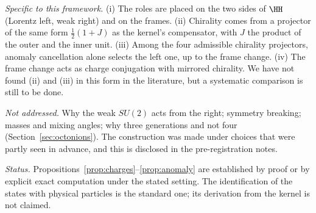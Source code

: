 \emph{Specific to this framework.}  (i) The roles are placed on the two sides of \(\HH\) (Lorentz left, weak right) and on the frames.
(ii) Chirality comes from a projector of the same form \(\tfrac12(1+J)\) as the kernel's compensator, with \(J\) the product of the outer and
the inner unit.  (iii) Among the four admissible chirality projectors, anomaly cancellation alone selects the left one, up to the frame
change.  (iv) The frame change acts as charge conjugation with mirrored chirality.  We have not found (ii) and (iii) in this form in the
literature, but a systematic comparison is still to be done.

\emph{Not addressed.}  Why the weak \(SU(2)\) acts from the right; symmetry breaking; masses and mixing angles; why three generations and
not four (Section~\ref{sec:octonions}).  The construction was made under choices that were partly seen in advance, and this is disclosed in
the pre-registration notes.

\medskip\noindent\emph{Status.}  Propositions~\ref{prop:charges}--\ref{prop:anomaly} are established by proof or by explicit exact
computation under the stated setting.  The identification of the states with physical particles is the standard one; its derivation
from the kernel is not claimed.
